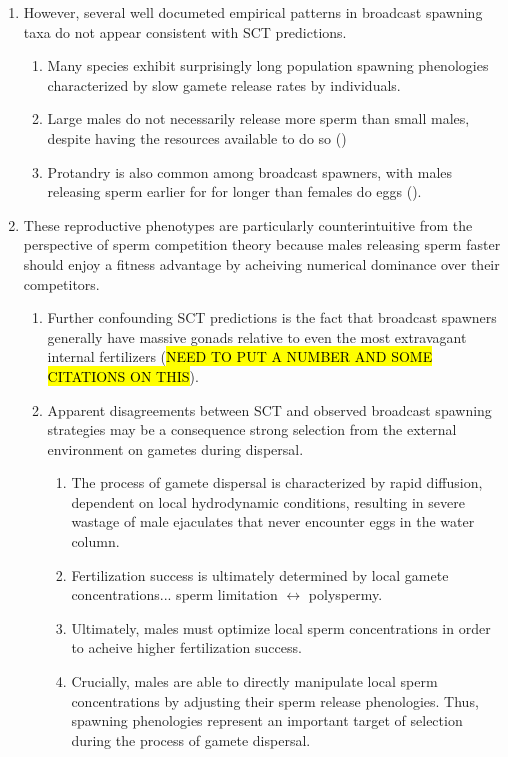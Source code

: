 \documentclass{article}
\begin{document}
\begin{enumerate}
	\item However, several well documeted empirical patterns in broadcast spawning taxa do not appear consistent with SCT predictions.
		\begin{enumerate}
			\item Many species exhibit surprisingly long population spawning phenologies characterized by slow gamete release rates by individuals.
			\item Large males do not necessarily release more sperm than small males, despite having the resources available to do so (\citealt{Styan2003})
			\item Protandry is also common among broadcast spawners, with males releasing sperm earlier for for longer than females do eggs (\citealt{McEuan1988, LotterhosLevitan2011, Levitan2005, MarshallBolton2007}).
		\end{enumerate}

	\item These reproductive phenotypes are particularly counterintuitive from the perspective of sperm competition theory because males releasing sperm faster should enjoy a fitness advantage by acheiving numerical dominance over their competitors.
		\begin{enumerate}
			\item Further confounding SCT predictions is the fact that broadcast spawners generally have massive gonads relative to even the most extravagant internal fertilizers (\hl{NEED TO PUT A NUMBER AND SOME CITATIONS ON THIS}).
			\item Apparent disagreements between SCT and observed broadcast spawning strategies may be a consequence strong selection 	from the external environment on gametes during dispersal.
			\begin{enumerate}
				\item The process of gamete dispersal is characterized by rapid diffusion, dependent on local hydrodynamic conditions, resulting in severe wastage of male ejaculates that never encounter eggs in the water column.
				\item Fertilization success is ultimately determined by local gamete concentrations... sperm limitation \(\leftrightarrow\) polyspermy.
				\item Ultimately, males must optimize local sperm concentrations in order to acheive higher fertilization success.
				\item Crucially, males are able to directly manipulate local sperm concentrations by adjusting their sperm release phenologies. Thus, spawning phenologies represent an important target of selection during the process of gamete dispersal.
			\end{enumerate}	
		\end{enumerate}


\end{enumerate}
\end{document}
